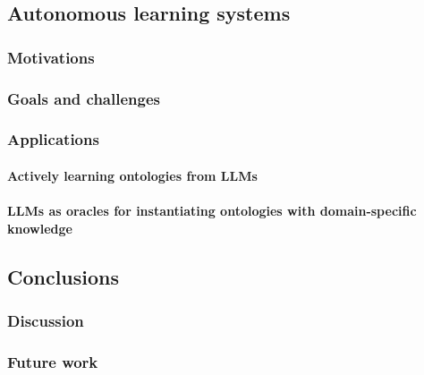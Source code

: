 \documentclass[12pt,a4paper,openright,twoside]{book}
\begin{document}

\chapter{Autonomous learning systems}\label{ch:autonomous-learning-systems}

\section{Motivations}\label{sec:motivations}

\section{Goals and challenges}\label{sec:goals-and-challenges}

\section{Applications}\label{sec:applications}

\subsection{Actively learning ontologies from \acp{LLM}}\label{subsec:exact-learning-with-ac{llm}}

\subsection{\Aclp{LLM} as oracles for instantiating ontologies with domain-specific knowledge}\label{subsec:llm-as-oracles-for-instantiating-ontologies-with-domain-specific-knowledge}


\chapter{Conclusions}\label{ch:conclusions}

\section{Discussion}\label{sec:discussion}

\section{Future work}\label{sec:future-work}


\backmatter

\part*{}

\nocite{*} %


\end{document}
